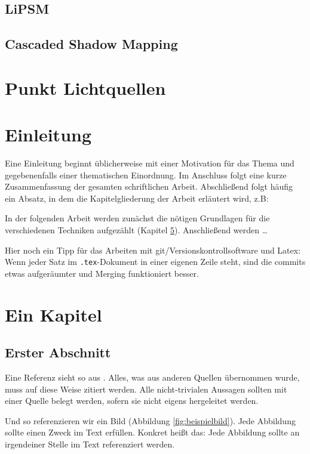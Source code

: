 \section{LiPSM}
\section{Cascaded Shadow Mapping}
\chapter{Punkt Lichtquellen}



\chapter{Einleitung}
\label{ch:Introduction}
Eine Einleitung beginnt üblicherweise mit einer Motivation für das Thema und gegebenenfalls einer thematischen Einordnung.
Im Anschluss folgt eine kurze Zusammenfassung der gesamten schriftlichen Arbeit.
Abschließend folgt häufig ein Absatz, in dem die Kapitelgliederung der Arbeit erläutert wird, z.B:

In der folgenden Arbeit werden zunächst die nötigen Grundlagen für die verschiedenen Techniken aufgezählt (Kapitel \ref{ch:Content1}).
Anschließend werden \dots



\vfill
Hier noch ein Tipp für das Arbeiten mit git/Versionskontrollsoftware und Latex:
Wenn jeder Satz im \texttt{.tex}-Dokument in einer eigenen Zeile steht, sind die commits etwas aufgeräumter und Merging funktioniert besser.


\chapter{Ein Kapitel}
\label{ch:Content1}


\section{Erster Abschnitt}
Eine Referenz sieht so aus \cite{becker2008a}.
Alles, was aus anderen Quellen übernommen wurde, muss auf diese Weise zitiert werden.
Alle nicht-trivialen Aussagen sollten mit einer Quelle belegt werden, sofern sie nicht eigens hergeleitet werden.

%
Und so referenzieren wir ein Bild (Abbildung \ref{fig:beispielbild}).
Jede Abbildung sollte einen Zweck im Text erfüllen.
Konkret heißt das: Jede Abbildung sollte an irgendeiner Stelle im Text referenziert werden.

